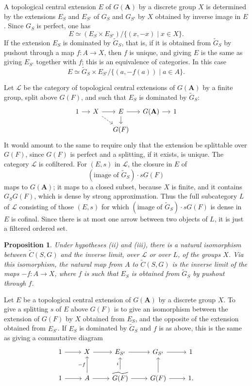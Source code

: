 \documentclass[10pt]{amsart}
\theoremstyle{plain}
\newtheorem{proposition}{Proposition}
\theoremstyle{definition}
\begin{document}
A topological central extension $E$ of $G(\mathbf A)$ by a discrete group $X$ is determined by the extensions $E_S$ and $E_{S'}$ of $G_S$ and $G_{S'}$ by $X$ obtained by inverse image in $E$. Since $G_S$ is perfect, one has
\[
E\simeq(E_S\times E_{S'})/\{(x,-x)\mid x\in X\}.
\]
If the extension $E_S$ is dominated by $\widetilde G_S$, that is, if it is obtained from $\widetilde G_S$ by pushout through a map $f:A\to X$, then $f$ is unique, and giving $E$ is the same as giving $E_{S'}$ together with $f$; this is an equivalence of categories. In this case
\[
E\simeq \widetilde G_S\times E_{S'}/\{(a,-f(a))\mid a\in A\}.
\]

Let $\mathscr L$ be the category of topological central extensions of $G(\mathbf A)$ by a finite group, split above $G(F)$, and such that $E_S$ is dominated by $\widetilde G_S$:
\[
\begin{tikzcd}[column sep=small, row sep=small]
1 \arrow[r] & X \arrow[r] \arrow[dr, dashrightarrow] & E \arrow[r] \arrow[d] & G(\mathbf A) \arrow[r] & 1 \\
& & G(F) & &
\end{tikzcd}
\]
It would amount to the same to require only that the extension be splittable over $G(F)$, since $G(F)$ is perfect and a splitting, if it exists, is unique. The category $\mathscr L$ is cofiltered. For $(E,s)$ in $\mathscr L$, the closure in $E$ of
\[
(\text{image of }\widetilde G_S)\cdot sG(F)
\]
maps to $G(\mathbf A)$; it maps to a closed subset, because $X$ is finite, and it contains $G_SG(F)$, which is dense by strong approximation. Thus the full subcategory $L$ of $\mathscr L$ consisting of those $(E,s)$ for which $(\text{image of }\widetilde G_S)\cdot sG(F)$ is dense in $E$ is cofinal. Since there is at most one arrow between two objects of $L$, it is just a filtered ordered set.

\begin{proposition}
Under hypotheses (ii) and (iii), there is a natural isomorphism between $\widetilde C(S,G)$ and the inverse limit, over $\mathscr L$ or over $L$, of the groups $X$. Via this isomorphism, the natural map from $A$ to $\widetilde C(S,G)$ is the inverse limit of the maps $-f:A\to X$, where $f$ is such that $E_S$ is obtained from $\widetilde G_S$ by pushout through $f$.
\end{proposition}

Let $E$ be a topological central extension of $G(\mathbf A)$ by a discrete group $X$. To give a splitting $s$ of $E$ above $G(F)$ is to give an isomorphism between the extension of $G(F)$ by $X$ obtained from $E_S$, and the opposite of the extension obtained from $E_{S'}$. If $E_S$ is dominated by $\widetilde G_S$ and $f$ is as above, this is the same as giving a commutative diagram
\[
\begin{tikzcd}
1 \arrow[r] & X \arrow[r] & E_{S'} \arrow[r] & G_{S'} \arrow[r] & 1 \\
1 \arrow[r] & A \arrow[u, "-f"] \arrow[r] & \widetilde{G(F)} \arrow[u, "i"] \arrow[r] & G(F) \arrow[u] \arrow[r] & 1.
\end{tikzcd}
\]
\end{document}
